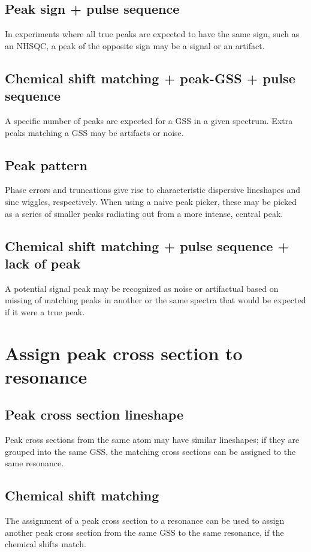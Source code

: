 \subsection*{Peak sign + pulse sequence}
In experiments where all true peaks are
expected to have the same sign, such as an NHSQC, a peak of the opposite
sign may be a signal or an artifact.

\subsection*{Chemical shift matching + peak-GSS + pulse sequence}
A specific number of peaks are expected for a GSS in a given spectrum.
Extra peaks matching a GSS may be artifacts or noise.

\subsection*{Peak pattern}
Phase errors and truncations give rise to characteristic dispersive lineshapes
and sinc wiggles, respectively.  When using a naive peak picker, these may
be picked as a series of smaller peaks radiating out from a more intense,
central peak.

\subsection*{Chemical shift matching + pulse sequence + lack of peak}
A potential signal peak may be recognized as noise or artifactual based on
missing of matching peaks in another or the same spectra that would be 
expected if it were a true peak.



\section*{Assign peak cross section to resonance}

\subsection*{Peak cross section lineshape}
Peak cross sections from the same atom may have similar lineshapes;
if they are grouped into the same GSS, the matching cross sections can be
assigned to the same resonance.

\subsection*{Chemical shift matching}
The assignment of a peak cross section to a resonance can be used to assign 
another peak cross section from the same GSS to the same resonance, if the 
chemical shifts match.



